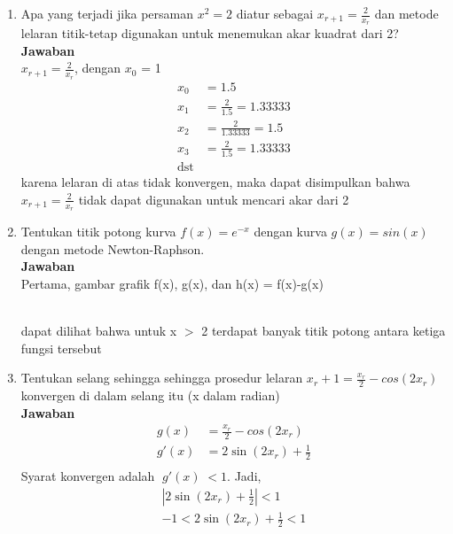 \documentclass[fleqn]{article}
\newcommand{\jaw}{\\ \textbf{Jawaban} \\}
\begin{document}
\begin{enumerate}
	\item Apa yang terjadi jika persaman $x^2 = 2$ diatur sebagai $x_{r+1} = \frac{2}{x_r}$ dan metode lelaran titik-tetap digunakan untuk menemukan akar kuadrat dari 2?
			\jaw 
			$x_{r+1} = \frac{2}{x_r} $, dengan $x_0$ = 1
			\begin{align*}
				x_{0} &= 1.5 \\
				x_{1} &= \frac{2}{1.5} = 1.33333 \\
				x_{2} &= \frac{2}{1.33333} = 1.5 \\
				x_{3} &= \frac{2}{1.5} = 1.33333 \\
				\text{dst}
			\end{align*}
			karena lelaran di atas tidak konvergen, maka dapat disimpulkan bahwa $x_{r+1} = \frac{2}{x_r}$ tidak dapat digunakan untuk mencari akar dari 2
		\item Tentukan titik potong kurva $f(x) = e^{-x}$ dengan kurva $g(x) = sin(x)$ dengan metode Newton-Raphson.
			\jaw 
			Pertama, gambar grafik f(x), g(x), dan h(x) = f(x)-g(x) \\
			 \\ 
			dapat dilihat bahwa untuk x $>$ 2 terdapat banyak titik potong antara ketiga fungsi tersebut
		\item Tentukan selang sehingga sehingga prosedur lelaran $x_r+1= \frac{x_r}{2} - cos(2x_r)$ konvergen di dalam selang itu (x dalam radian)
			\jaw 
			\begin{align*}
				g(x) &= \frac{x_r}{2} - cos(2x_r) \\
				g'(x) &= 2 \sin(2x_r) + \frac{1}{2} \\
			\end{align*}
			Syarat konvergen adalah $g'(x) < 1$. Jadi,
			\begin{align*}
				| 2 \sin(2x_r) + \frac{1}{2} | < 1 \\
				-1 < 2 \sin(2x_r) + \frac{1}{2} < 1 \\

\end{align*}
\end{enumerate}
\end{document}
